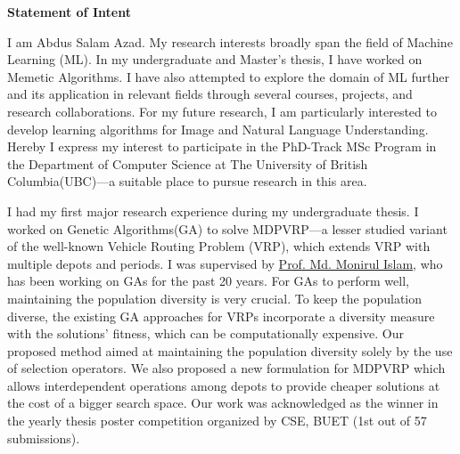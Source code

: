 \documentclass[12pt]{article}
\begin{document}


\fancyhf{}
\rfoot{\thepage}

\begin{center}
{\LARGE \bf 
Statement of Intent}\\
\end{center}



I am Abdus Salam Azad. My research interests broadly span the field of Machine Learning (ML). In my undergraduate and Master's thesis, I have worked on Memetic Algorithms. I have also attempted to explore the domain of ML further and its application in relevant fields through several courses, projects, and research collaborations. For my future research, I am particularly interested to develop learning algorithms for Image and Natural Language Understanding. Hereby I express my interest to participate in the PhD-Track MSc Program in the Department of Computer Science at The University of British Columbia(UBC)---a suitable place to pursue research in this area. 

I had my first major research experience during my undergraduate thesis. I worked on Genetic Algorithms(GA) to solve MDPVRP---a lesser studied variant of the well-known Vehicle Routing Problem (VRP), which extends VRP with multiple depots and periods. I was supervised by \href{http://cse.buet.ac.bd/faculty/facdetail.php?id=mdmonirulislam}{Prof. Md. Monirul Islam}, who has been working on GAs for the past 20 years. For GAs to perform well, maintaining the population diversity is very crucial. To keep the population diverse, the existing GA approaches for VRPs incorporate a diversity measure with the solutions' fitness, which can be computationally expensive. Our proposed method aimed at maintaining the population diversity solely by the use of selection operators. We also proposed a new formulation for MDPVRP which allows interdependent operations among depots to provide cheaper solutions at the cost of a bigger search space. Our work was acknowledged as the winner in the yearly thesis poster competition organized by CSE, BUET (1st out of 57 submissions).
\end{document}
